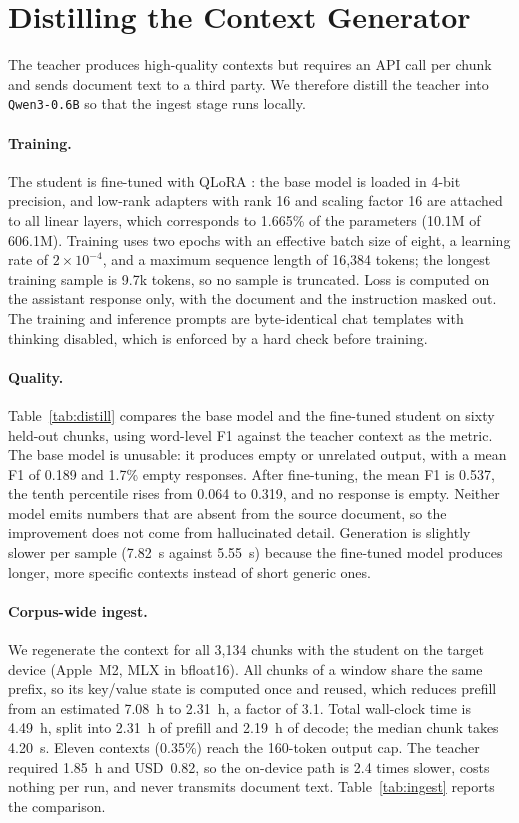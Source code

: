 \section{Distilling the Context Generator}
\label{sec:distill}

The teacher produces high-quality contexts but requires an API call per chunk
and sends document text to a third party. We therefore distill the teacher into
\texttt{Qwen3-0.6B} \citep{qwen3} so that the ingest stage runs locally.

\paragraph{Training.}
The student is fine-tuned with QLoRA \citep{dettmers2023qlora}: the base model
is loaded in 4-bit precision, and low-rank adapters \citep{hu2022lora} with
rank 16 and scaling factor 16 are attached to all linear layers, which
corresponds to 1.665\% of the parameters (10.1M of 606.1M). Training uses two
epochs with an effective batch size of eight, a learning rate of
$2\times10^{-4}$, and a maximum sequence length of 16{,}384 tokens; the longest
training sample is 9.7k tokens, so no sample is truncated. Loss is computed on
the assistant response only, with the document and the instruction masked out.
The training and inference prompts are byte-identical
chat templates with thinking disabled, which is enforced by a hard check before
training.

\paragraph{Quality.}
Table~\ref{tab:distill} compares the base model and the fine-tuned student on
sixty held-out chunks, using word-level F1 against the teacher context as the
metric. The base model is unusable: it produces empty or unrelated output, with
a mean F1 of 0.189 and 1.7\% empty responses. After fine-tuning, the mean F1 is
0.537, the tenth percentile rises from 0.064 to 0.319, and no response is
empty. Neither model emits numbers that are absent from the source document, so
the improvement does not come from hallucinated detail. Generation is slightly
slower per sample (7.82~s against 5.55~s) because the fine-tuned model produces
longer, more specific contexts instead of short generic ones.



\paragraph{Corpus-wide ingest.}
We regenerate the context for all 3{,}134 chunks with the student on the target
device (Apple~M2, MLX in bfloat16). All chunks of a window share the same
prefix, so its key/value state is computed once and reused, which reduces
prefill from an estimated 7.08~h to 2.31~h, a factor of 3.1. Total wall-clock
time is 4.49~h, split into 2.31~h of prefill and 2.19~h of decode; the median
chunk takes 4.20~s. Eleven contexts (0.35\%) reach the 160-token output cap.
The teacher required 1.85~h and USD~0.82, so the on-device path is 2.4 times
slower, costs nothing per run, and never transmits document text.
Table~\ref{tab:ingest} reports the comparison.
